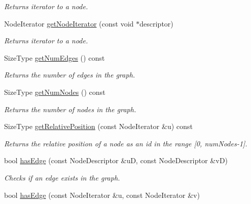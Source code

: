 \begin{DoxyCompactItemize}
\begin{DoxyCompactList}\small\item\em Returns iterator to a node. \item\end{DoxyCompactList}\item 
NodeIterator \hyperlink{class_dynamic_graph_a4ea070c2f0f4f667dd4f6c518644c8ae}{getNodeIterator} (const void $\ast$descriptor)
\begin{DoxyCompactList}\small\item\em Returns iterator to a node. \item\end{DoxyCompactList}\item 
SizeType \hyperlink{class_dynamic_graph_a3a57f9cd640cba12352a22e0e4410654}{getNumEdges} () const 
\begin{DoxyCompactList}\small\item\em Returns the number of edges in the graph. \item\end{DoxyCompactList}\item 
SizeType \hyperlink{class_dynamic_graph_ac2a52e7af5a154a54282f816bf9af54e}{getNumNodes} () const 
\begin{DoxyCompactList}\small\item\em Returns the number of nodes in the graph. \item\end{DoxyCompactList}\item 
SizeType \hyperlink{class_dynamic_graph_ad1e501790b0784cd925f766ca4ab6e0c}{getRelativePosition} (const NodeIterator \&u) const 
\begin{DoxyCompactList}\small\item\em Returns the relative position of a node as an id in the range \mbox{[}0, numNodes-\/1\mbox{]}. \item\end{DoxyCompactList}\item 
bool \hyperlink{class_dynamic_graph_a90e4a5161f28877b5723924bd9a290fe}{hasEdge} (const NodeDescriptor \&uD, const NodeDescriptor \&vD)
\begin{DoxyCompactList}\small\item\em Checks if an edge exists in the graph. \item\end{DoxyCompactList}\item 
bool \hyperlink{class_dynamic_graph_a67dcf2352cfd2eb25141301f4362e88f}{hasEdge} (const NodeIterator \&u, const NodeIterator \&v)

\end{DoxyCompactItemize}
